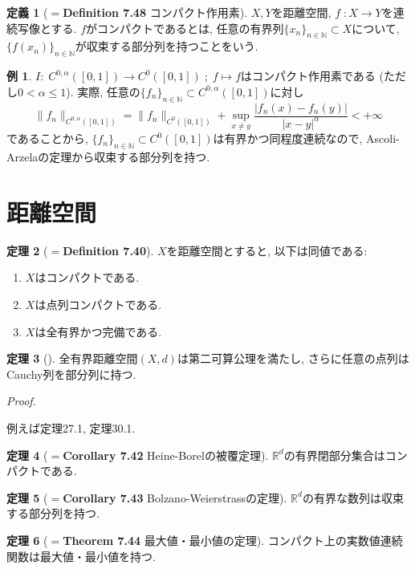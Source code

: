 \documentclass{jsarticle}
\newcommand{\N}{\mathbb{N}}%
\newcommand{\R}{\mathbb{R}}%
\renewenvironment{proof}[1][Proof]{%
\begin{proofbox}%
\textit{#1. }\ignorespaces
}{%
\hfill\qedsymbol%
\end{proofbox}%
}
\theoremstyle{definition}
\newtheorem{thm}{定理}[section]
\newtheorem{dfn}[thm]{定義}
\newtheorem*{thm*}{例}
\begin{document}
\begin{dfn}[$=$\textbf{Definition 7.48} コンパクト作用素]
$X, Y$を距離空間, $f\;\colon X\to Y$を連続写像とする. $f$がコンパクトであるとは, 任意の有界列$\{x_n\}_{n\in\N}\subset X$について, $\{f(x_n)\}_{n\in\N}$が収束する部分列を持つことをいう.
\end{dfn}

\begin{thm*}
$I\colon\;C^{0,\alpha}([0, 1])\to C^{0}([0, 1])\;;\;f\mapsto f$はコンパクト作用素である (ただし$0<\alpha\le 1$). 実際, 任意の$\{f_n\}_{n\in\N}\subset C^{0,\alpha}([0, 1])$に対し
\[
\|f_n\|_{C^{0,\alpha}([0, 1])} = \|f_n\|_{C^{0}([0, 1])}+\sup_{x\neq y}\dfrac{|f_n(x)-f_n(y)|}{|x-y|^\alpha} < +\infty
\]
であることから, $\{f_n\}_{n\in\N}\subset C^{0}([0, 1])$は有界かつ同程度連続なので, Ascoli-Arzelaの定理から収束する部分列を持つ.
\end{thm*}

\newpage
\section{距離空間}
\begin{thm}[$=$\textbf{Definition 7.40}]
$X$を距離空間とすると, 以下は同値である$\colon$
\begin{enumerate}
\item[(1)] $X$はコンパクトである.
\item[(2)] $X$は点列コンパクトである.
\item[(3)] $X$は全有界かつ完備である.
\end{enumerate}
\end{thm}

\begin{thm}[]
全有界距離空間$(X, d)$は第二可算公理を満たし, さらに任意の点列はCauchy列を部分列に持つ.
\end{thm}
\begin{proof}
例えば\cite{内田}定理27.1, \cite{藤岡}定理30.1.
\end{proof}

\begin{thm}[$=$\textbf{Corollary 7.42} Heine-Borelの被覆定理]
$\R^d$の有界閉部分集合はコンパクトである.
\end{thm}

\begin{thm}[$=$\textbf{Corollary 7.43} Bolzano-Weierstrassの定理]
$\R^d$の有界な数列は収束する部分列を持つ.
\end{thm}

\begin{thm}[$=$\textbf{Theorem 7.44} 最大値・最小値の定理]
コンパクト上の実数値連続関数は最大値・最小値を持つ.
\end{thm}
\end{document}
